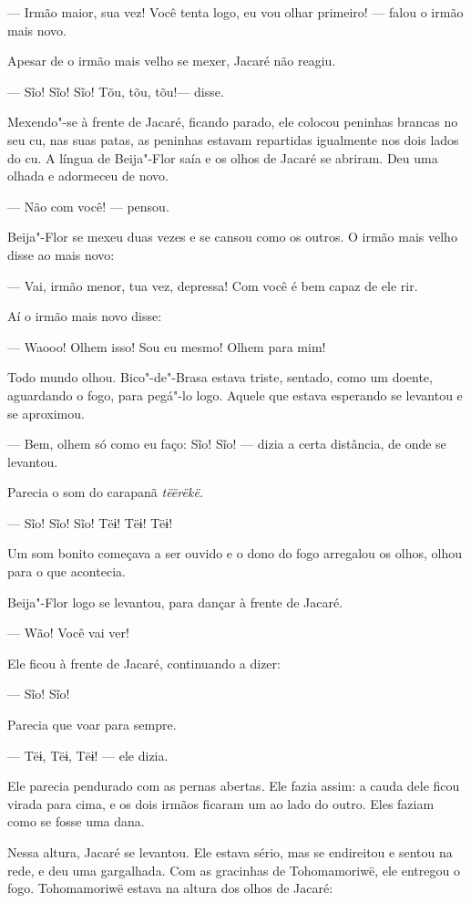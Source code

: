 --- Irmão maior, sua vez! Você tenta logo, eu vou olhar primeiro! ---
falou o irmão mais novo. 

Apesar de o irmão mais velho se mexer, Jacaré não reagiu.

--- Sĩo! Sĩo! Sĩo! Tõu, tõu, tõu!--- disse.

Mexendo"-se à frente de Jacaré, ficando parado, ele colocou peninhas
brancas no seu cu, nas suas patas, as peninhas estavam repartidas
igualmente nos dois lados do cu. A língua de Beija"-Flor saía e os
olhos de Jacaré se abriram. Deu uma olhada e adormeceu de novo. 

--- Não com você! --- pensou. 

Beija"-Flor se mexeu duas vezes e se cansou como os outros.
O irmão mais velho disse ao mais novo: 

--- Vai, irmão menor, tua vez, depressa! Com você é bem capaz de ele
rir.

Aí o irmão mais novo disse:

--- Waooo! Olhem isso! Sou eu mesmo! Olhem para mim! 

Todo mundo olhou. Bico"-de"-Brasa estava triste, sentado, como um
doente, aguardando o fogo, para pegá"-lo logo. Aquele que estava esperando
se levantou e se aproximou. 

--- Bem, olhem só como eu faço: Sĩo! Sĩo! --- dizia a certa
distância, de onde se levantou. 

Parecia o som do carapanã \emph{tëërëkë.}

--- Sĩo! Sĩo! Sĩo! Tëɨ! Tëɨ! Tëɨ!

Um som bonito começava a ser ouvido e o dono do fogo arregalou os olhos,
olhou para o que acontecia.

Beija"-Flor logo se levantou, para dançar à frente de Jacaré.

--- Wão! Você vai ver!

Ele ficou à frente de Jacaré, continuando a dizer:

--- Sĩo! Sĩo!

Parecia que voar para sempre. 

--- Tëɨ, Tëɨ, Tëɨ! --- ele dizia. 

Ele parecia pendurado com as pernas abertas. Ele fazia assim: a cauda
dele ficou virada para cima, e os dois irmãos ficaram um ao lado do
outro. Eles faziam como se fosse uma dana. 

Nessa altura, Jacaré se levantou. Ele estava sério, mas se endireitou e
sentou na rede, e deu uma gargalhada. Com as gracinhas de Tohomamoriwë,
ele entregou o fogo. Tohomamoriwë estava na altura dos olhos de Jacaré: 

